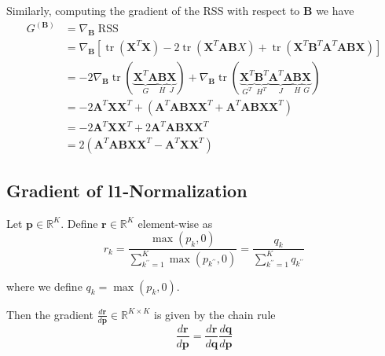 \documentclass{article}
\begin{document}
Similarly, computing the gradient of the RSS with respect to $\mathbf{B}$ we have
\begin{equation}
    \label{eq:gradB}
    \begin{aligned}
        G^{(\mathbf{B})} &= \nabla_\mathbf{B} \operatorname{RSS} \\
        &= \nabla_\mathbf{B} \left[ \operatorname{tr}(\mathbf{X}^T \mathbf{X}) - 2 \operatorname{tr}(\mathbf{X}^T \mathbf{A} \mathbf{B} X) + \operatorname{tr}(\mathbf{X}^T \mathbf{B}^T \mathbf{A}^T \mathbf{A} \mathbf{B} \mathbf{X}) \right] \\
        &= - 2 \nabla_\mathbf{B} \operatorname{tr}(\underbrace{\mathbf{X}^T \mathbf{A}}_{G} \underbrace{\mathbf{B}}_{H} \underbrace{\mathbf{X}}_{J}) + \nabla_\mathbf{B} \operatorname{tr}(\underbrace{\mathbf{X}^T}_{G^T} \underbrace{\mathbf{B}^T}_{H^T} \underbrace{\mathbf{A}^T \mathbf{A}}_{J} \underbrace{\mathbf{B}}_{H} \underbrace{\mathbf{X}}_{G}) \\
        & = - 2 \mathbf{A}^T \mathbf{X} \mathbf{X}^T + \left( \mathbf{A}^T \mathbf{A} \mathbf{B} \mathbf{X} \mathbf{X}^T + \mathbf{A}^T \mathbf{A} \mathbf{B} \mathbf{X} \mathbf{X}^T \right) \\
        & = - 2 \mathbf{A}^T \mathbf{X} \mathbf{X}^T + 2 \mathbf{A}^T \mathbf{A} \mathbf{B} \mathbf{X} \mathbf{X}^T  \\
        & = 2 \left( \mathbf{A}^T \mathbf{A} \mathbf{B} \mathbf{X} \mathbf{X}^T - \mathbf{A}^T \mathbf{X} \mathbf{X}^T \right)
    \end{aligned}
\end{equation}

\subsection{Gradient of l1-Normalization}
\label{subsec:gradl1}

Let $\mathbf{p} \in \mathbb{R}^K$. Define $\mathbf{r} \in \mathbb{R}^K$ element-wise as
\begin{equation}
    {r}_k = \frac{\max(p_k, 0)}{\sum_{k^{\prime \prime}=1}^K \max(p_{k^{\prime \prime}}, 0)} = \frac{q_k}{\sum_{k^{\prime \prime}=1}^K q_{k^{\prime \prime}}}
\end{equation}

where we define $q_k = \max(p_k, 0)$.

Then the gradient $\frac{d \mathbf{r}}{d \mathbf{p}} \in \mathbb{R}^{K \times K}$ is given by the chain rule
\begin{equation}
    \frac{d \mathbf{r}}{d \mathbf{p}} = \frac{d \mathbf{r}}{d \mathbf{q}} \frac{d \mathbf{q}}{d \mathbf{p}}
\end{equation}
\end{document}
